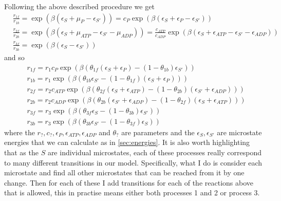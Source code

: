 \documentclass[11pt]{article}
\begin{document}
Following the above described procedure we get
\begin{align}
    &\frac{r_{1f}}{r_{1b}} = \exp(\beta(\epsilon_S+\mu_P-\epsilon_{S'})) = c_P\exp(\beta(\epsilon_S+\epsilon_P-\epsilon_{S'})) \\
    &\frac{r_{2f}}{r_{2b}} = \exp(\beta(\epsilon_S+\mu_{ATP}-\epsilon_{S'}-\mu_{ADP})) = \frac{c_{ATP}}{c_{ADP}}\exp(\beta(\epsilon_S+\epsilon_{ATP}-\epsilon_{S'}-\epsilon_{ADP})) \\
    &\frac{r_{3f}}{r_{3b}} = \exp(\beta(\epsilon_S-\epsilon_{S'}))
\end{align}
and so
\begin{align}
    &r_{1f} = r_1c_P\exp(\beta(\theta_{1f}(\epsilon_S+\epsilon_P)-(1-\theta_{1b})\epsilon_{S'})) \label{eq:rate1f} \\
    &r_{1b} = r_1\exp(\beta(\theta_{1b}\epsilon_{S'}-(1-\theta_{1f})(\epsilon_S+\epsilon_P))) \label{eq:rate1b} \\
    &r_{2f} = r_2c_{ATP}\exp(\beta(\theta_{2f}(\epsilon_S+\epsilon_{ATP})-(1-\theta_{2b})(\epsilon_{S'}+\epsilon_{ADP}))) \label{eq:rate2f} \\
    &r_{2b} = r_2c_{ADP}\exp(\beta(\theta_{2b}(\epsilon_{S'}+\epsilon_{ADP})-(1-\theta_{2f})(\epsilon_S+\epsilon_{ATP}))) \label{eq:rate2b} \\
    &r_{3f} = r_3\exp(\beta(\theta_{3f}\epsilon_S-(1-\theta_{3b})\epsilon_{S'})) \label{eq:rate3f} \\
    &r_{3b} = r_3\exp(\beta(\theta_{3b}\epsilon_{S'}-(1-\theta_{3f})\epsilon_S)) \label{eq:rate3b}
\end{align}
where the $r_?,c_?,\epsilon_P,\epsilon_{ATP},\epsilon_{ADP}$ and $\theta_?$ are parameters and the $\epsilon_S,\epsilon_{S'}$ are microstate energies that we can calculate as in \cref{sec:energies}.
It is also worth highlighting that as the $S$ are individual microstates, each of these processes really correspond to many different transitions in our model.
Specifically, what I do is consider each microstate and find all other microstates that can be reached from it by one change.
Then for each of these I add transitions for each of the reactions above that is allowed, this in practise means either both processes 1 and 2 or process 3.
\end{document}
